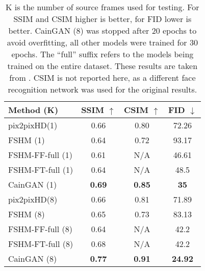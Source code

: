 \documentclass[11pt,a4paper]{article}
\begin{document}
\setlength{\tabcolsep}{1em}
\begin{table}[t]
\centering
\begin{tabular}{l c c c}
     Method (K) & SSIM $\uparrow$ & CSIM $\uparrow$ & FID $\downarrow$  \\
     \hline
     pix2pixHD(1) & 0.66 & 0.80 & 72.26 \\ 
     FSHM (1) & 0.64 & 0.72 & 93.17 \\
     FSHM-FF-full (1) & 0.61 & N/A & 46.61 \\
     FSHM-FT-full (1) & 0.64 & N/A & 48.5 \\
     CainGAN (1) & \textbf{0.69} & \textbf{0.85} & \textbf{35} \\
     \hline
     pix2pixHD(8) & 0.66 & 0.81 & 71.89 \\ 
     FSHM (8) & 0.65 & 0.73 & 83.13 \\
     FSHM-FF-full (8) & 0.64 & N/A & 42.2 \\
     FSHM-FT-full (8) & 0.68 & N/A & 42.2 \\
     CainGAN (8) & \textbf{0.77} & \textbf{0.91} & \textbf{24.92} \\
     \hline
\end{tabular}
\caption{K is the number of source frames used for testing. For SSIM and CSIM higher is better, for FID lower is better. CainGAN (8) was stopped after 20 epochs to avoid overfitting, all other models were trained for 30 epochs. The ``full'' suffix refers to the models being trained on the entire dataset. These results are taken from \cite{zakharov2019fewshot}. CSIM is not reported here, as a different face recognition network was used for the original results.
}
\label{tab:exp}
\end{table}
\end{document}
